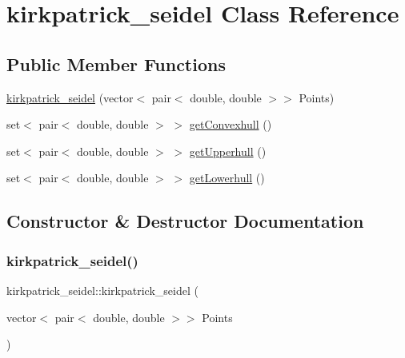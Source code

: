 \hypertarget{classkirkpatrick__seidel}{}\section{kirkpatrick\+\_\+seidel Class Reference}
\label{classkirkpatrick__seidel}
\subsection*{Public Member Functions}
\begin{DoxyCompactItemize}
\item 
\hyperlink{classkirkpatrick__seidel_a94a8c63d4ee95969baa0a5ec3b6d0e7d}{kirkpatrick\+\_\+seidel} (vector$<$ pair$<$ double, double $>$$>$ Points)
\item 
set$<$ pair$<$ double, double $>$ $>$ \hyperlink{classkirkpatrick__seidel_ad1f7b4aac8829f16ba46ef9d54604f5e}{get\+Convexhull} ()
\item 
set$<$ pair$<$ double, double $>$ $>$ \hyperlink{classkirkpatrick__seidel_a2780be982683d28841042553a7f8d405}{get\+Upperhull} ()
\item 
set$<$ pair$<$ double, double $>$ $>$ \hyperlink{classkirkpatrick__seidel_a689118150a83f5ec577d51df646ff13c}{get\+Lowerhull} ()
\end{DoxyCompactItemize}


\subsection{Constructor \& Destructor Documentation}
\mbox{\label{classkirkpatrick__seidel_a94a8c63d4ee95969baa0a5ec3b6d0e7d}} 
\subsubsection{\texorpdfstring{kirkpatrick\+\_\+seidel()}{kirkpatrick\_seidel()}}
{\footnotesize\ttfamily kirkpatrick\+\_\+seidel\+::kirkpatrick\+\_\+seidel (\begin{DoxyParamCaption}\item[{vector$<$ pair$<$ double, double $>$$>$}]{Points }\end{DoxyParamCaption})\hspace{0.3cm}{\ttfamily [inline]}}


